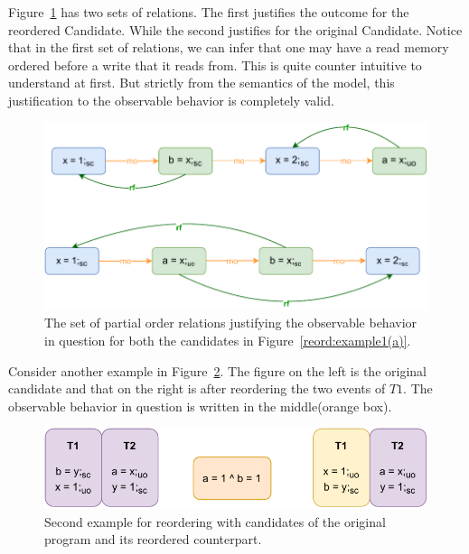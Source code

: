         Figure~\ref{reord:example1(b)} has two sets of relations. 
        The first justifies the outcome for the reordered Candidate. 
        While the second justifies for the original Candidate. 
        Notice that in the first set of relations, we can infer that one may have a read memory ordered before a write that it reads from. 
        This is quite counter intuitive to understand at first. 
        But strictly from the semantics of the model, this justification to the observable behavior is completely valid\footnotemark. 
        \begin{figure}[H]
            \centering
            \includegraphics[scale=0.7]{5.InstructionReordering/0.Intro/ReorderingExample1(b).pdf}
            \caption{The set of partial order relations justifying the observable behavior in question for both the candidates in Figure~\ref{reord:example1(a)}.} 
            \label{reord:example1(b)}
        \end{figure}

        
        Consider another example in Figure~\ref{reord:example2(a)}.
        The figure on the left is the original candidate and that on the right is after reordering the two events of $T1$.
        The observable behavior in question is written in the middle(orange box). 
        \begin{figure}[H]
            \centering
            \includegraphics[scale=0.7]{5.InstructionReordering/0.Intro/ReorderingExample2(a).pdf}
            \caption{Second example for reordering with candidates of the original program and its reordered counterpart.} 
            \label{reord:example2(a)}
        \end{figure}
   
